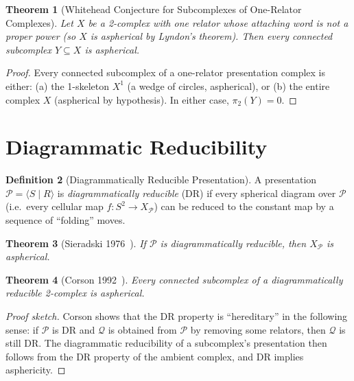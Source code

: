\documentclass[12pt,a4paper]{amsart}
\newtheorem{theorem}{Theorem}[section]
\theoremstyle{definition}
\newtheorem{definition}[theorem]{Definition}
\theoremstyle{remark}
\begin{document}
\begin{theorem}[Whitehead Conjecture for Subcomplexes of One-Relator Complexes]
Let $X$ be a 2-complex with one relator whose attaching word is not
a proper power (so $X$ is aspherical by Lyndon's theorem). Then every
connected subcomplex $Y \subseteq X$ is aspherical.
\end{theorem}

\begin{proof}
Every connected subcomplex of a one-relator presentation complex is either:
(a) the 1-skeleton $X^1$ (a wedge of circles, aspherical), or
(b) the entire complex $X$ (aspherical by hypothesis).
In either case, $\pi_2(Y) = 0$.
\end{proof}

\section{Diagrammatic Reducibility}

\begin{definition}[Diagrammatically Reducible Presentation]
A presentation $\mathcal{P} = \langle S \mid R \rangle$ is
\emph{diagrammatically reducible} (DR) if every spherical diagram over
$\mathcal{P}$ (i.e.\ every cellular map $f \colon S^2 \to X_{\mathcal{P}}$)
can be reduced to the constant map by a sequence of ``folding'' moves.
\end{definition}

\begin{theorem}[Sieradski 1976~\cite{Sieradski1976}]
If $\mathcal{P}$ is diagrammatically reducible, then $X_{\mathcal{P}}$
is aspherical.
\end{theorem}

\begin{theorem}[Corson 1992~\cite{Corson1992}]
\label{thm:Corson}
Every connected subcomplex of a diagrammatically reducible 2-complex
is aspherical.
\end{theorem}

\begin{proof}[Proof sketch]
Corson shows that the DR property is ``hereditary'' in the following sense:
if $\mathcal{P}$ is DR and $\mathcal{Q}$ is obtained from $\mathcal{P}$
by removing some relators, then $\mathcal{Q}$ is still DR. The
diagrammatic reducibility of a subcomplex's presentation then follows from
the DR property of the ambient complex, and DR implies asphericity.
\end{proof}
\end{document}
